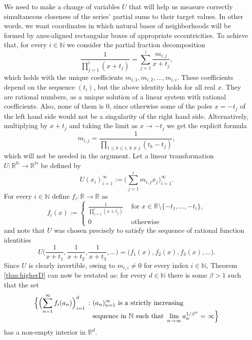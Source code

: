 \documentclass[11pt,letterpaper,reqno]{amsart}
\numberwithin{equation}{section}
\theoremstyle{definition}
\numberwithin{equation}{section}
\begin{document}
We need to make a change of variables $U$ that will help us measure correctly simultaneous closeness of the series' partial sums to their target values.
In other words, we want coordinates in which natural bases of neighborhoods will be formed by axes-aligned rectangular boxes of appropriate eccentricities.
To achieve that, for every $i\in\mathbb{N}$ we consider the partial fraction decomposition
\[ \frac{1}{\prod_{j=1}^{i}(x+t_j)} = \sum_{j=1}^{i} \frac{m_{i,j}}{x+t_j}, \]
which holds with the unique coefficients $m_{i,1},m_{i,2},\ldots,m_{i,i}$.
These coefficients depend on the sequence $(t_i)$, but the above identity holds for all real $x$. They are rational numbers, as a unique solution of a linear system with rational coefficients. Also, none of them is $0$, since otherwise some of the poles $x=-t_j$ of the left hand side would not be a singularity of the right hand side.
Alternatively, multiplying by $x+t_j$ and taking the limit as $x\to -t_j$ we get the explicit formula
\[ m_{i,j} = \frac{1}{\prod_{1\leqslant k\leqslant i,\, k\neq j} (t_k-t_j)}, \]
which will not be needed in the argument.
Let a linear transformation $U\colon\mathbb{R}^{\mathbb{N}}\to\mathbb{R}^{\mathbb{N}}$ be defined by
\[ U(x_i)_{i=1}^{\infty} := \biggl(\sum_{j=1}^{i} m_{i,j} x_j \biggr)_{i=1}^{\infty}. \]
For every $i\in\mathbb{N}$ define $f_i\colon\mathbb{R} \to \mathbb{R}$ as
\[ f_i(x) :=
\begin{cases}
\displaystyle\frac{1}{\prod_{j=1}^{i}(x+t_j)} & \text{ for } x\in\mathbb{R}\setminus\{-t_1,\ldots,-t_i\}, \\
0 & \text{ otherwise}
\end{cases} \]
and note that $U$ was chosen precisely to satisfy the sequence of rational function identities
\begin{equation}\label{eq:howUmaps}
U \Big( \frac{1}{x+t_1}, \frac{1}{x+t_2}, \frac{1}{x+t_3}, \ldots \Big)
= \big( f_1(x), f_2(x), f_3(x), \ldots \big).
\end{equation}
Since $U$ is clearly invertible, owing to $m_{i,i}\neq 0$ for every index $i\in\mathbb{N}$, Theorem \ref{thm:higherD} can now be restated as: for every $d\in\mathbb{N}$ there is some $\beta>1$ such that the set
\begin{align}
\Bigl\{ \Bigl( \sum_{n=1}^{\infty} f_i(a_n) \Bigr)_{i=1}^{d} \,:\
& \text{$(a_n)_{n=1}^{\infty}$ is a strictly increasing} \nonumber \\[-3mm]
& \text{sequence in $\mathbb{N}$ such that } \lim_{n\to\infty} a_n^{1/\beta^n} = \infty \Bigr\} \label{eq:strongerhd}
\end{align}
has a non-empty interior in $\mathbb{R}^d$.
\end{document}
